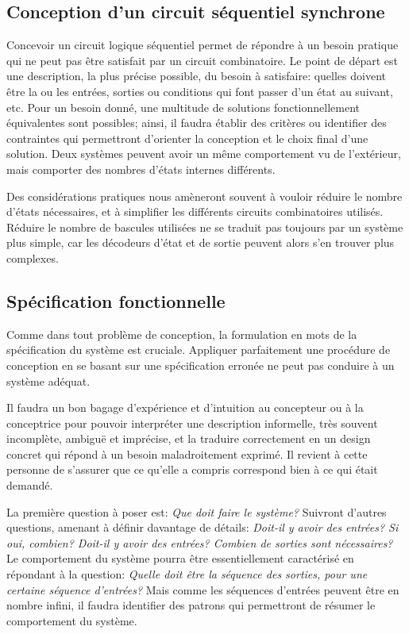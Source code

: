 \documentclass[11pt]{article}
\begin{document}
\subsection{Conception d'un circuit séquentiel synchrone}
\label{sec:orgd1d1dbc}

Concevoir un circuit logique séquentiel permet de répondre à un besoin
pratique qui ne peut pas être satisfait par un circuit combinatoire.
Le point de départ est une description, la plus précise possible, du
besoin à satisfaire: quelles doivent être la ou les entrées, sorties
ou conditions qui font passer d'un état au suivant, etc. Pour un
besoin donné, une multitude de solutions fonctionnellement
équivalentes sont possibles; ainsi, il faudra établir des critères ou
identifier des contraintes qui permettront d'orienter la conception et
le choix final d'une solution. Deux systèmes peuvent avoir un même
comportement vu de l'extérieur, mais comporter des nombres d'états
internes différents.

Des considérations pratiques nous amèneront souvent à vouloir réduire
le nombre d'états nécessaires, et à simplifier les différents circuits
combinatoires utilisés. Réduire le nombre de bascules utilisées ne se
traduit pas toujours par un système plus simple, car les décodeurs
d'état et de sortie peuvent alors s'en trouver plus complexes.

\subsection{Spécification fonctionnelle}
\label{sec:org9caea00}

Comme dans tout problème de conception, la formulation en mots de la
spécification du système est cruciale. Appliquer parfaitement une
procédure de conception en se basant sur une spécification erronée ne
peut pas conduire à un système adéquat.

Il faudra un bon bagage d'expérience et d'intuition au concepteur ou à
la conceptrice pour pouvoir interpréter une description informelle,
très souvent incomplète, ambiguë et imprécise, et la traduire
correctement en un design concret qui répond à un besoin
maladroitement exprimé. Il revient à cette personne de s'assurer que
ce qu'elle a compris correspond bien à ce qui était demandé.

La première question à poser est: \emph{Que doit faire le système?}
Suivront d'autres questions, amenant à définir davantage de détails:
\emph{Doit-il y avoir des entrées? Si oui, combien? Doit-il y avoir des
entrées? Combien de sorties sont nécessaires?} Le comportement du
système pourra être essentiellement caractérisé en répondant à la
question: \emph{Quelle doit être la séquence des sorties, pour une certaine
séquence d'entrées?}  Mais comme les séquences d'entrées peuvent être
en nombre infini, il faudra identifier des patrons qui permettront de
résumer le comportement du système.
\end{document}
